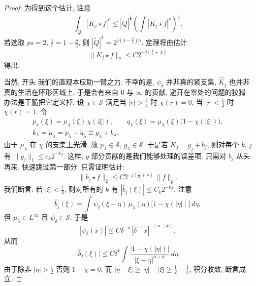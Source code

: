 \begin{proof}
为得到这个估计, 注意
\[
\int_{\tilde{Q}}|K_{j}\star f|^{p}\leq|\tilde{Q}|^{\frac{1}{r}}\left(\int|K_{j}\star f|^{s}\right)^{\frac{1}{s}}.
\]
若选取 $ps=2$, $\frac{1}{r}=1-\frac{p}{2}$, 则 $|\tilde{Q}|^{\frac{1}{r}}=2^{j(1-\frac{p}{2})n}$. 定理将由估计
\[
\|K_{j}\star f\|_{2}\leq C2^{-j(\frac{1}{2}+\lambda)}
\]
得出.

当然, 开头 我们的直观本应助一臂之力; 不幸的是, $\psi_\delta$ 并非真的紧支集, $\hat{K}_j$ 也并非真的生活在环形区域上. 于是会有来自 $0$ 与 $\infty$ 的贡献. 避开在零处的问题的狡猾办法是干脆把它定义掉. 设 $\chi\in\mathcal{S}$ 满足当 $|r|>\frac{3}{4}$ 时 $\chi(r)=0$, 当 $|r|<\frac{1}{2}$ 时 $\chi(r)=1$. 令
\begin{gather*}
p_{\lambda}(\xi)=\mu_{\lambda}(\xi)\,\chi(|\xi|),\qquad
q_{\lambda}(\xi)=\mu_{\lambda}(\xi)\bigl(1-\chi(|\xi|)\bigr), \\
k_{\lambda}=\check{\mu}_{\lambda}=\check{p}_{\lambda}+\check{q}_{\lambda}\equiv g_{\lambda}+b_{\lambda}.
\end{gather*}
由于 $\mu_{\lambda}$ 在 $\chi$ 的支集上光滑, 故 $p_{\lambda}\in\mathcal{S}$, $g_{\lambda}\in\mathcal{S}$. 于是若 $K_{j}=g_{j}+b_{j}$, 则对每个 $k$, $j$ 有 $\|g_{j}\|_{1}\leq c_{k}2^{-kj}$. 这样, $g$ 部分贡献的是我们能够处理的误差项. 只需对 $b_{j}$ 从头再来. 快速跳过第一部分, 只需证明估计:
\[
\bigl\|b_{j}\star f\bigr\|_{2}\leq C2^{-j(\frac{1}{2}+\lambda)}\,\|f\|_{p}.
\]
我们断言: 若 $|\xi|<\frac{1}{4}$, 则对所有的 $k$ 有 $|\hat{b}_j(\xi)|\leq C_k2^{-kj}$. 注意
\[
\hat{b}_{j}(\xi)=\int\psi_{\delta}(\xi-\eta)\,\mu_{\lambda}(\eta)\bigl[1-\chi(|\eta|)\bigr]\,d\eta,
\]
但 $\mu_{\lambda}\in L^{\infty}$ 且 $\psi_{\delta}\in\mathcal{S}$, 于是
\[
|\psi_{\delta}(x)|\leq C\delta^{-n}\,|\delta^{-1}x|^{-(n+k)},
\]
从而
\[
\bigl|\hat{b}_{j}(\xi)\bigr|\leq C\delta^{k}\int\frac{|1-\chi(|\eta|)|}{|\xi-\eta|^{n+k}}\,d\eta.
\]
由于除非 $|\eta|>\frac{1}{2}$ 否则 $1-\chi=0$, 而 $|\eta-\xi|\geq|\eta|-|\xi|\geq\frac{1}{2}-\frac{1}{4}$, 积分收敛, 断言成立.


\end{proof}
